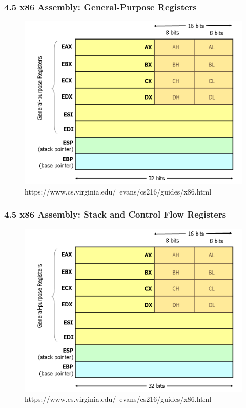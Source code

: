 \begin{frame}[fragile]
  \frametitle{4.5 x86 Assembly: General-Purpose Registers}
    \begin{figure}
        \includegraphics[scale=0.34]{images/x86-registers.png}
        \captionsetup{labelformat=empty,labelsep=none}
        \caption[]{\tiny https://www.cs.virginia.edu/~evans/cs216/guides/x86.html}
    \end{figure}
\end{frame}


\begin{frame}[fragile]
  \frametitle{4.5 x86 Assembly: Stack and Control Flow Registers}
    \begin{figure}
        \includegraphics[scale=0.34]{images/x86-registers.png}
        \captionsetup{labelformat=empty,labelsep=none}
        \caption[]{\tiny https://www.cs.virginia.edu/~evans/cs216/guides/x86.html}
    \end{figure}
\end{frame}


